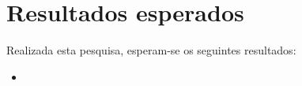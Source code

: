 \section{Resultados esperados}\label{Result}
Realizada esta pesquisa, esperam-se os seguintes resultados:
\begin{itemize}
	\item 
\end{itemize}
